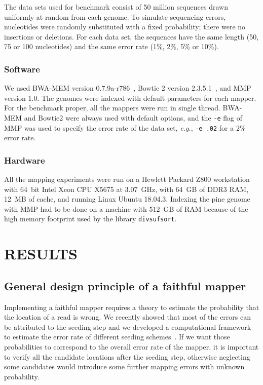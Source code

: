 \documentclass[a4,center,fleqn]{NAR}
\begin{document}
The data sets used for benchmark consist of 50 million sequences drawn
uniformly at random from each genome. To simulate sequencing errors,
nucleotides were randomly substituted with a fixed probability; there were
no insertions or deletions. For each data set, the sequences have the same
length (50, 75 or 100 nucleotides) and the same error rate (1\%, 2\%, 5\%
or 10\%).

\subsubsection{Software}

We used BWA-MEM version 0.7.9a-r786~\cite{li2013aligning}, Bowtie 2
version 2.3.5.1~\cite{pmid22388286}, and MMP version 1.0. The genomes were
indexed with default parameters for each mapper. For the benchmark proper,
all the mappers were run in single thread. BWA-MEM and Bowtie2 were always
used with default options, and the \texttt{-e} flag of MMP was used to
specify the error rate of the data set, \textit{e.g.}, \texttt{-e .02} for
a 2\% error rate.

\subsubsection{Hardware}

All the mapping experiments were run on a Hewlett Packard Z800 workstation
with 64~bit Intel Xeon CPU X5675 at 3.07~GHz, with 64~GB of DDR3 RAM,
12~MB of cache, and running Linux Ubuntu 18.04.3. Indexing the pine genome
with MMP had to be done on a machine with 512~GB of RAM because of the
high memory footprint used by the library \texttt{divsufsort}.


\section{RESULTS}

\subsection{General design principle of a faithful mapper}

Implementing a faithful mapper requires a theory to estimate the
probability that the location of a read is wrong. We recently showed that
most of the errors can be attributed to the seeding step and we developed
a computational framework to estimate the error rate of different seeding
schemes~\cite{Filion619155}. If we want those probabilities to correspond
to the overall error rate of the mapper, it is important to verify all the
candidate locations after the seeding step, otherwise neglecting some
candidates would introduce some further mapping errors with unknown
probability.
\end{document}
